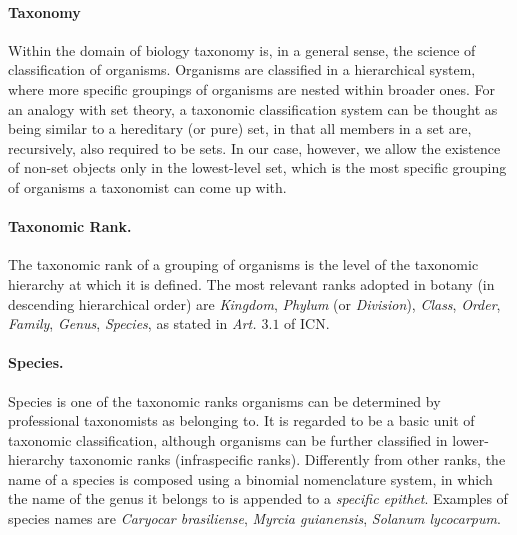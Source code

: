 \paragraph*{Taxonomy}
Within the domain of biology taxonomy is, in a general sense, the science of classification of organisms. 
Organisms are classified in a hierarchical system, where more specific groupings of organisms are nested within broader ones. 
For an analogy with set theory, a taxonomic classification system can be thought as being similar to a hereditary (or pure) set, in that all members in a set are, recursively, also required to be sets. In our case, however, we allow the existence of non-set objects only in the lowest-level set, which is the most specific grouping of organisms a taxonomist can come up with.

\paragraph*{Taxonomic Rank.}
The taxonomic rank of a grouping of organisms is the level of the taxonomic hierarchy at which it is defined. The most relevant ranks adopted in botany (in descending hierarchical order) are \textit{Kingdom}, \textit{Phylum} (or \textit{Division}), \textit{Class}, \textit{Order}, \textit{Family}, \textit{Genus}, \textit{Species}, as stated in \textit{Art. $3.1$} of ICN.

\paragraph*{Species.}
Species is one of the taxonomic ranks organisms can be determined by professional taxonomists as belonging to. It is regarded to be a basic unit of taxonomic classification, although organisms can be further classified in lower-hierarchy taxonomic ranks (infraspecific ranks).
Differently from other ranks, the name of a species is composed using a binomial nomenclature system, in which the name of the genus it belongs to is appended to a \textit{specific epithet}.
Examples of species names are \textit{Caryocar brasiliense}, \textit{Myrcia guianensis}, \textit{Solanum lycocarpum}.

